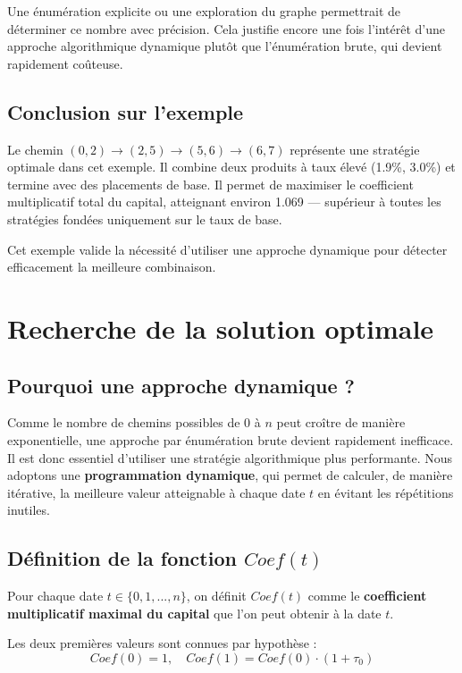 \documentclass[a4paper,11pt]{article}
\begin{document}
Une énumération explicite ou une exploration du graphe permettrait de déterminer ce nombre avec précision. Cela justifie encore une fois l’intérêt d’une approche algorithmique dynamique plutôt que l’énumération brute, qui devient rapidement coûteuse.


\subsection{Conclusion sur l’exemple}
Le chemin $(0,2) \to (2,5) \to (5,6) \to (6,7)$ représente une stratégie optimale dans cet exemple. Il combine deux produits à taux élevé (1.9\%, 3.0\%) et termine avec des placements de base. Il permet de maximiser le coefficient multiplicatif total du capital, atteignant environ 1.069 — supérieur à toutes les stratégies fondées uniquement sur le taux de base.

Cet exemple valide la nécessité d’utiliser une approche dynamique pour détecter efficacement la meilleure combinaison.



\section{Recherche de la solution optimale}

\subsection{Pourquoi une approche dynamique ?}

Comme le nombre de chemins possibles de 0 à $n$ peut croître de manière exponentielle, une approche par énumération brute devient rapidement inefficace. Il est donc essentiel d’utiliser une stratégie algorithmique plus performante.  
Nous adoptons une \textbf{programmation dynamique}, qui permet de calculer, de manière itérative, la meilleure valeur atteignable à chaque date $t$ en évitant les répétitions inutiles.

\subsection{Définition de la fonction $Coef(t)$}

Pour chaque date $t \in \{0, 1, ..., n\}$, on définit $Coef(t)$ comme le \textbf{coefficient multiplicatif maximal du capital} que l’on peut obtenir à la date $t$.

Les deux premières valeurs sont connues par hypothèse :
\[
	Coef(0) = 1, \quad Coef(1) = Coef(0) \cdot (1 + \tau_0)
\]
\end{document}
